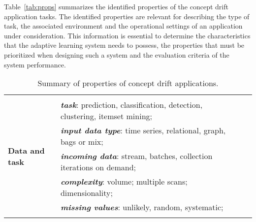 \documentclass{llncs}
\begin{document}
Table~\ref{tab:props} summarizes the identified properties of the concept drift application tasks.
The identified properties are relevant for describing the type of task, the
associated environment and the operational settings of an application under consideration.
This information is essential to determine the characteristics that the adaptive learning system needs to possess, the properties that must be prioritized when designing such a system and the evaluation criteria of the system performance.
\begin{table}[h]
\centering
\caption{Summary of properties of concept drift applications.}
{\footnotesize
\begin{tabular}{|l|l|l|}
            \hline
    \multirow{7}{*}{\begin{sideways}\textbf{Data and task}\end{sideways}}
    \multirow{7}{*}{\begin{sideways}\end{sideways}}
            & \multicolumn{1}{p{10cm}|}{}\\
            & \multicolumn{1}{p{10cm}|}{\textbf{\emph{task}}: prediction, classification, detection, clustering, itemset mining;} \\%
            & \multicolumn{1}{p{10cm}|}{\textbf{\emph{input data type}}: time series, relational, graph, bags or mix;} \\%
            & \multicolumn{1}{p{10cm}|}{\textbf{\emph{incoming data}}: stream, batches, collection iterations on demand;} \\%
            & \multicolumn{1}{p{10cm}|}{\textbf{\emph{complexity}}: volume; multiple scans; dimensionality;} \\
            & \multicolumn{1}{p{10cm}|}{\textbf{\emph{missing values}}: unlikely, random, systematic;} \\
            & \multicolumn{1}{p{10cm}|}{}\\
            \hline


\end{tabular}}
\end{table}
\end{document}
